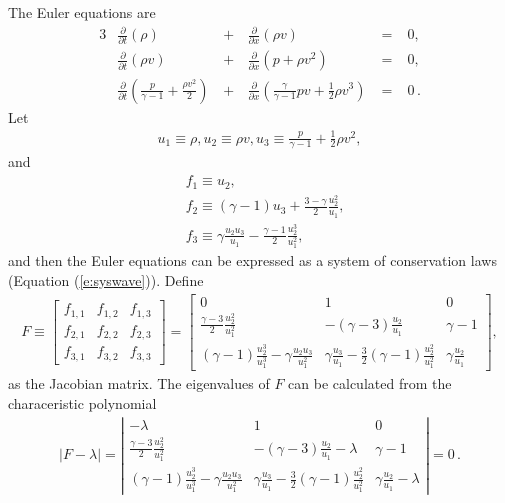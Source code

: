 \documentclass[11pt,dvips]{article}
\numberwithin{equation}{section}
\begin{document}
The Euler equations are
\begin{alignat}{3}
  & \frac{\partial}{\partial t}(\rho)
    &\,+\,& \frac{\partial}{\partial x}(\rho v) &\;=\;& 0
    , \label{e:euler1} \\
  & \frac{\partial}{\partial t}(\rho v)
    &\,+\,& \frac{\partial}{\partial x}(p+\rho v^2) &\;=\;& 0
    , \label{e:euler2} \\
  & \frac{\partial}{\partial t}(\frac{p}{\gamma-1}+\frac{\rho v^2}{2})
    &\,+\,& \frac{\partial}{\partial x}
      (\frac{\gamma}{\gamma-1}pv+\frac{1}{2}\rho v^3) &\;=\;& 0
    \,. \label{e:euler3}
  \end{alignat}
Let
\begin{align*}
  u_1 \equiv \rho,
  u_2 \equiv \rho v,
  u_3 \equiv \frac{p}{\gamma-1} + \frac{1}{2}\rho v^2,
\end{align*}
and
\begin{align*}
  &f_1 \equiv u_2, \\
  &f_2 \equiv (\gamma-1)u_3 + \frac{3-\gamma}{2}\frac{u_2^2}{u_1}, \\
  &f_3 \equiv \gamma\frac{u_2u_3}{u_1}
             - \frac{\gamma-1}{2}\frac{u_2^3}{u_1^2},
\end{align*}
and then the Euler equations can be expressed as a system of conservation
laws (Equation (\ref{e:syswave})).
Define
\begin{align}
  F \equiv
    \left[\begin{array}{ccc}
      f_{1,1} & f_{1,2} & f_{1,3} \\
      f_{2,1} & f_{2,2} & f_{2,3} \\
      f_{3,1} & f_{3,2} & f_{3,3}
    \end{array}\right]
    =
    \left[\begin{array}{ccc}
      0 & 1 & 0 \\
      \frac{\gamma-3}{2}\frac{u_2^2}{u_1^2} &
      -(\gamma-3)\frac{u_2}{u_1} &
      \gamma-1 \\
      (\gamma-1)\frac{u_2^3}{u_1^3} - \gamma\frac{u_2u_3}{u_1^2} &
      \gamma\frac{u_3}{u_1} - \frac{3}{2}(\gamma-1)\frac{u_2^2}{u_1^2} &
      \gamma\frac{u_2}{u_1}
    \end{array}\right], \label{e:euler_jacobian}
\end{align}
as the Jacobian matrix.
The eigenvalues of $F$ can be calculated from the characeristic
polynomial
\begin{align*}
  |F-\lambda| =
    \left|\begin{array}{ccc}
      -\lambda & 1 & 0 \\
      \frac{\gamma-3}{2}\frac{u_2^2}{u_1^2}
      & -(\gamma-3)\frac{u_2}{u_1} - \lambda
      & \gamma-1 \\
      (\gamma-1)\frac{u_2^3}{u_1^3} - \gamma\frac{u_2u_3}{u_1^2}
      & \gamma\frac{u_3}{u_1} - \frac{3}{2}(\gamma-1)\frac{u_2^2}{u_1^2}
      & \gamma\frac{u_2}{u_1} - \lambda
    \end{array}\right| = 0\,.
\end{align*}
\end{document}
